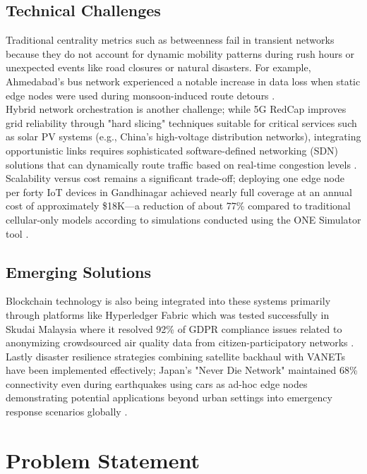 \documentclass[12pt,a4paper]{report}
\begin{document}
\subsection{Technical Challenges}
Traditional centrality metrics such as betweenness fail in transient networks because
they do not account for dynamic mobility patterns during rush hours or unexpected
events like road closures or natural disasters. For example, Ahmedabad's bus network
experienced a notable increase in data loss when static edge nodes were used during
monsoon-induced route detours \cite{Gandhi_2023}.\\
Hybrid network orchestration is another challenge; while 5G RedCap improves grid
reliability through "hard slicing" techniques suitable for critical services such
as solar PV systems (e.g., China's high-voltage distribution networks), integrating
opportunistic links requires sophisticated software-defined networking (SDN)
solutions that can dynamically route traffic based on real-time congestion levels \cite{GSMA2024} \cite{Liu_2024}.\pagebreak \\
Scalability versus cost remains a significant trade-off; deploying one edge node
per forty IoT devices in Gandhinagar achieved nearly full coverage at an annual
cost of approximately \$18K—a reduction of about 77\% compared to traditional
cellular-only models according to simulations conducted using the ONE Simulator tool \cite{Gandhi_2023}.
\subsection{Emerging Solutions}
Blockchain technology is also being integrated into these systems primarily through
platforms like Hyperledger Fabric which was tested successfully in Skudai Malaysia
where it resolved 92\% of GDPR compliance issues related to anonymizing crowdsourced
air quality data from citizen-participatory networks \cite{Alasbali_2022}.\\
Lastly disaster resilience strategies combining satellite backhaul with VANETs have
been implemented effectively; Japan's "Never Die Network" maintained 68\% connectivity
even during earthquakes using cars as ad-hoc edge nodes demonstrating potential
applications beyond urban settings into emergency response scenarios globally \cite{Andersson_2014}.

\section{Problem Statement}
\end{document}
